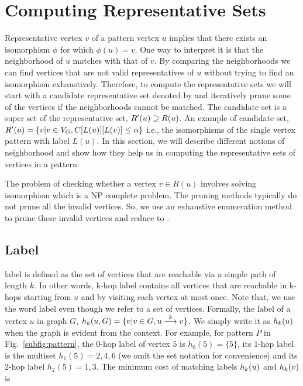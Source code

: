 
\section{Computing Representative Sets} Representative vertex $v$ of a pattern
vertex $u$ implies that there exists an isomorphism $\phi$ for which $\phi(u) =
v$.  One way to interpret it is that the neighborhood of $u$ matches with that
of $v$.  By comparing the neighborhoods we can find vertices that are not valid
representatives of $u$ without trying to find an isomorphism exhaustively.
Therefore, to compute the representative sets we will start with a candidate
representative set denoted by \CR  and iteratively prune some of the vertices if
the neighborhoods cannot be matched.  The candidate set is a super set of the
representative set, $\CR \supseteq \RS$.  An example of candidate set, $ \CR =
\{v| v \in \vg, \matij{C}{L(u)}{L(v)} \leq \alpha \}$ i.e., the isomorphisms of
the single vertex pattern with label $L(u)$.  In this section, we will describe
different notions of neighborhood and show how they help us in computing the
representative sets of vertices in a pattern.

The problem of checking whether a vertex $v \in R(u)$ involves solving
isomorphism which is a NP complete problem. The pruning methods typically do not
prune all the invalid vertices.  So, we use an exhaustive enumeration method to
prune these invalid vertices and reduce \CR to \RS.

 \subsection{\khop Label}
 \khop label is defined as the set of vertices that are reachable via a simple
 path of length $k$.  In other words, k-hop label contains all vertices that are
 reachable in k-hops starting from $u$ and by visiting each vertex at most once.
 Note that, we use the word label even though we refer to a set of vertices.
 Formally, the \khop label of a vertex $u$ in graph $G$, $\khopl{k}{u,G} = \{v |
 v \in G, \kpath{u}{v}{k}\}$.  We simply write it as $\khopl{k}{u}$ when the
 graph is evident from the context.  For example, for pattern $P$ in
 Fig.~\ref{subfig:pattern}, the $0$-hop label of vertex $5$ is $h_0(5) = \{5\}$,
 its $1$-hop label is the multiset $h_1(5) = 2, 4, 6$ (we omit the set notation
 for convenience) and its $2$-hop label $h_2(5) = 1, 3$. The minimum cost of
 matching \khop labels $\khopl{k}{u}$ and $\khopl{k}{v}$ is 

